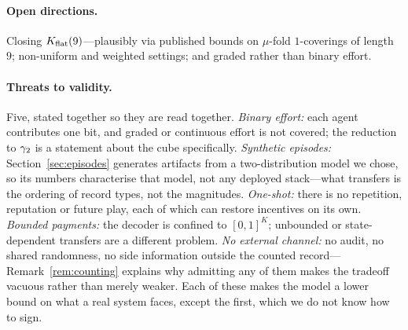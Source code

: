 \paragraph{Open directions.}
Closing $K_{\mathrm{flat}}(9)$---plausibly via published bounds on $\mu$-fold
$1$-coverings of length $9$; non-uniform and weighted settings; and graded rather
than binary effort.

\paragraph{Threats to validity.}
Five, stated together so they are read together. \emph{Binary effort:} each agent
contributes one bit, and graded or continuous effort is not covered; the
reduction to $\gamma_2$ is a statement about the cube specifically.
\emph{Synthetic episodes:} Section~\ref{sec:episodes} generates artifacts from a
two-distribution model we chose, so its numbers characterise that model, not any
deployed stack---what transfers is the ordering of record types, not the
magnitudes. \emph{One-shot:} there is no repetition, reputation or future play,
each of which can restore incentives on its own. \emph{Bounded payments:} the
decoder is confined to $[0,1]^K$; unbounded or state-dependent transfers are a
different problem. \emph{No external channel:} no audit, no shared randomness, no
side information outside the counted record---Remark~\ref{rem:counting} explains
why admitting any of them makes the tradeoff vacuous rather than merely weaker.
Each of these makes the model a lower bound on what a real system faces, except
the first, which we do not know how to sign.
